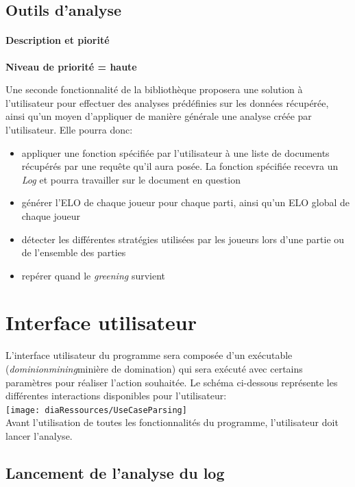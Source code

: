 \subsection{Outils d'analyse}

\paragraph*{Description et piorité}

\textbf{Niveau de priorité = haute}

Une seconde fonctionnalité de la  bibliothèque proposera une solution à l'utilisateur pour effectuer des analyses prédéfinies sur les données récupérée, ainsi qu'un moyen d'appliquer de manière générale une analyse créée par l'utilisateur. Elle pourra donc:
\begin{itemize}
\item appliquer une fonction spécifiée par l'utilisateur à une liste de documents récupérés par une requête qu'il aura posée. La fonction spécifiée recevra un \textit{Log} et pourra travailler sur le document en question
\item générer l'ELO de chaque joueur pour chaque parti, ainsi qu'un ELO global de chaque joueur
\item détecter les différentes stratégies utilisées par les joueurs lors d'une partie ou de l'ensemble des parties
\item repérer quand le \textit{greening} survient
\end{itemize}

\iffalse
\section{Interface utilisateur}
L'interface utilisateur du programme sera composée d'un exécutable (\textit{dominionmining}minière de domination) qui sera exécuté avec certains paramètres pour réaliser l'action souhaitée. Le schéma ci-dessous représente les différentes interactions disponibles pour l'utilisateur:\\

\texttt{[image: diaRessources/UseCaseParsing]}\\
Avant l'utilisation de toutes les fonctionnalités du programme, l'utilisateur doit lancer l'analyse.
\subsection{Lancement de l'analyse du log}
